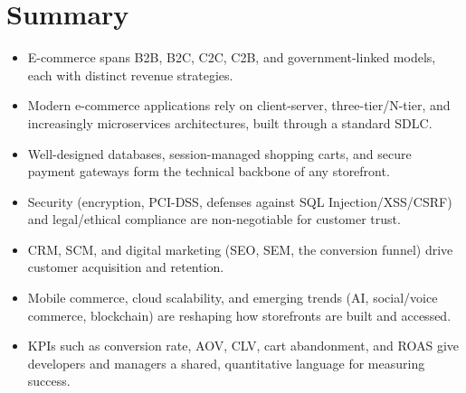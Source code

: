 \documentclass[11pt,a4paper]{article}
\begin{document}
\section{Summary}

\begin{examplebox}
\begin{itemize}[leftmargin=*]
  \item E-commerce spans B2B, B2C, C2C, C2B, and government-linked models, each with distinct revenue strategies.
  \item Modern e-commerce applications rely on client-server, three-tier/N-tier, and increasingly microservices architectures, built through a standard SDLC.
  \item Well-designed databases, session-managed shopping carts, and secure payment gateways form the technical backbone of any storefront.
  \item Security (encryption, PCI-DSS, defenses against SQL Injection/XSS/CSRF) and legal/ethical compliance are non-negotiable for customer trust.
  \item CRM, SCM, and digital marketing (SEO, SEM, the conversion funnel) drive customer acquisition and retention.
  \item Mobile commerce, cloud scalability, and emerging trends (AI, social/voice commerce, blockchain) are reshaping how storefronts are built and accessed.
  \item KPIs such as conversion rate, AOV, CLV, cart abandonment, and ROAS give developers and managers a shared, quantitative language for measuring success.
\end{itemize}
\end{examplebox}
\end{document}
